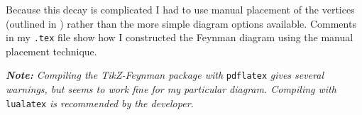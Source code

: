 \documentclass[12pt, letterpaper]{article}
\begin{document}
Because this decay is complicated I had to use manual placement of the vertices (outlined in \citet[Sec 2.4.3]{Ellis2016}) rather than the more simple diagram options available. Comments in my \texttt{.tex} file show how I constructed the Feynman diagram using the manual placement technique.
\vspace{4mm}

\noindent \emph{\textbf{Note:} Compiling the TikZ-Feynman package with} \texttt{pdflatex} \emph{gives several warnings, but seems to work fine for my particular diagram. Compiling with} \texttt{lualatex} \emph{is recommended by the developer.}



\clearpage




\end{document}
